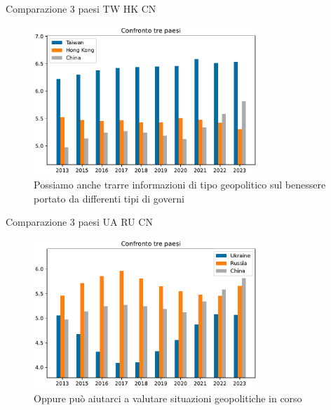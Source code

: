 \documentclass{beamer}
\begin{document}
\begin{frame}{Comparazione 3 paesi TW HK CN}
	\begin{figure}
		\centering
		\includegraphics[width=0.75\textwidth]{"./img/3ComparoPaesi_Taiwan_HongKong_China.pdf"}
		\caption{Possiamo anche trarre informazioni di tipo geopolitico sul benessere portato da differenti tipi di governi}
	\end{figure}
\end{frame}

\begin{frame}{Comparazione 3 paesi UA RU CN}
	\begin{figure}
		\centering
		\includegraphics[width=0.75\textwidth]{"./img/3ComparoPaesi_Ukraine_Russia_China.pdf"}
		\caption{Oppure può aiutarci a valutare situazioni geopolitiche in corso}
	\end{figure}
\end{frame}
\end{document}
